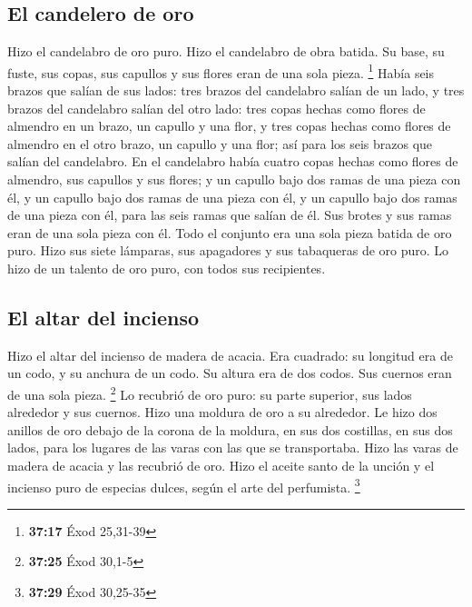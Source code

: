 \begin{paracol}{2}
\hypertarget{el-candelero-de-oro}{%
\subsection{El candelero de oro}\label{el-candelero-de-oro}}

 Hizo el candelabro de oro puro. Hizo el candelabro de
obra batida. Su base, su fuste, sus copas, sus capullos y sus flores
eran de una sola pieza. \footnote{\textbf{37:17} Éxod 25,31-39}
 Había seis brazos que salían de sus lados: tres brazos
del candelabro salían de un lado, y tres brazos del candelabro salían
del otro lado:  tres copas hechas como flores de almendro
en un brazo, un capullo y una flor, y tres copas hechas como flores de
almendro en el otro brazo, un capullo y una flor; así para los seis
brazos que salían del candelabro.  En el candelabro había
cuatro copas hechas como flores de almendro, sus capullos y sus flores;
 y un capullo bajo dos ramas de una pieza con él, y un
capullo bajo dos ramas de una pieza con él, y un capullo bajo dos ramas
de una pieza con él, para las seis ramas que salían de él.
 Sus brotes y sus ramas eran de una sola pieza con él.
Todo el conjunto era una sola pieza batida de oro puro. 
Hizo sus siete lámparas, sus apagadores y sus tabaqueras de oro puro.
 Lo hizo de un talento de oro puro, con todos sus
recipientes.

\hypertarget{el-altar-del-incienso}{%
\subsection{El altar del incienso}\label{el-altar-del-incienso}}

 Hizo el altar del incienso de madera de acacia. Era
cuadrado: su longitud era de un codo, y su anchura de un codo. Su altura
era de dos codos. Sus cuernos eran de una sola pieza. \footnote{\textbf{37:25}
  Éxod 30,1-5}  Lo recubrió de oro puro: su parte
superior, sus lados alrededor y sus cuernos. Hizo una moldura de oro a
su alrededor.  Le hizo dos anillos de oro debajo de la
corona de la moldura, en sus dos costillas, en sus dos lados, para los
lugares de las varas con las que se transportaba.  Hizo
las varas de madera de acacia y las recubrió de oro. 
Hizo el aceite santo de la unción y el incienso puro de especias dulces,
según el arte del perfumista. \footnote{\textbf{37:29} Éxod 30,25-35}


\end{paracol}
